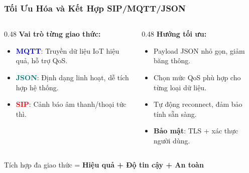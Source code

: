 \begin{frame}
\frametitle{Tối Ưu Hóa và Kết Hợp SIP/MQTT/JSON}

\begin{columns}[T,onlytextwidth]
    \begin{column}{0.48\textwidth}
        \textbf{Vai trò từng giao thức:}
        \begin{itemize}
            \item \textcolor{blue}{\textbf{MQTT}}: Truyền dữ liệu IoT hiệu quả, hỗ trợ QoS.
            \item \textcolor{teal}{\textbf{JSON}}: Định dạng linh hoạt, dễ tích hợp hệ thống.
            \item \textcolor{red}{\textbf{SIP}}: Cảnh báo âm thanh/thoại tức thì.
        \end{itemize}
    \end{column}

    \begin{column}{0.48\textwidth}
        \textbf{Hướng tối ưu:}
        \begin{itemize}
            \item Payload JSON nhỏ gọn, giảm băng thông.
            \item Chọn mức QoS phù hợp cho từng loại dữ liệu.
            \item Tự động reconnect, đảm bảo tính sẵn sàng.
            \item \textbf{Bảo mật}: TLS + xác thực người dùng.
        \end{itemize}
    \end{column}
\end{columns}

\vspace{0.5em}
\begin{block}{\centering Tích hợp đa giao thức = \textbf{Hiệu quả + Độ tin cậy + An toàn}}
\end{block}

\end{frame}
